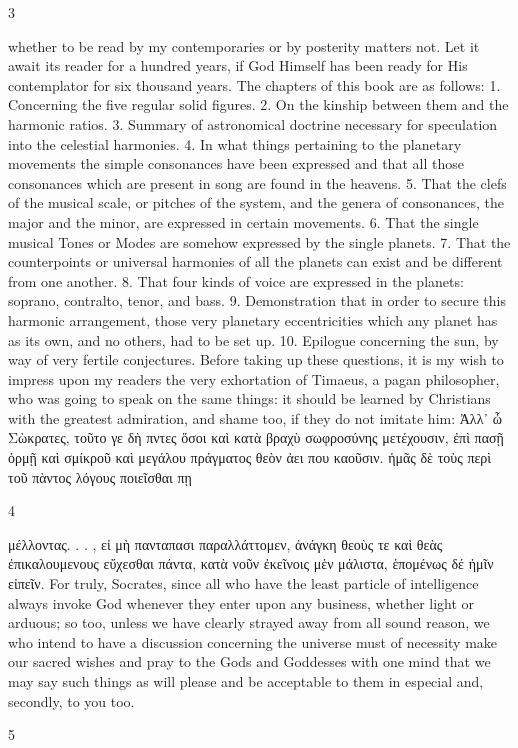 \documentclass{article}
\begin{document}
3

whether to be read by my contemporaries or by posterity matters not.
Let it await its reader for a hundred years, if God Himself has been ready
for His contemplator for six thousand years.
The chapters of this book are as follows:
1. Concerning the five regular solid figures.
2. On the kinship between them and the harmonic ratios.
3. Summary of astronomical doctrine necessary for speculation into the
celestial harmonies.
4. In what things pertaining to the planetary movements the simple
consonances have been expressed and that all those consonances which
are present in song are found in the heavens.
5. That the clefs of the musical scale, or pitches of the system, and the
genera of consonances, the major and the minor, are expressed in certain
movements.
6. That the single musical Tones or Modes are somehow expressed by the
single planets.
7. That the counterpoints or universal harmonies of all the planets can
exist and be different from one another.
8. That four kinds of voice are expressed in the planets: soprano,
contralto, tenor, and bass.
9. Demonstration that in order to secure this harmonic arrangement,
those very planetary eccentricities which any planet has as its own, and
no others, had to be set up.
10. Epilogue concerning the sun, by way of very fertile conjectures.
Before taking up these questions, it is my wish to impress upon my
readers the very exhortation of Timaeus, a pagan philosopher, who was
going to speak on the same things: it should be learned by Christians
with the greatest admiration, and shame too, if they do not imitate him:
Ἀλλ᾽ ὦ Σὼκρατες, τοῦτο γε δὴ πντες ὅσοι καὶ κατὰ βραχὺ σωφροσύνης
μετέχουσιν, ἐπὶ πασῇ ὁρμῇ καὶ σμίκροῦ καὶ μεγάλου πράγματος θεὸν ἀει
που καοῦσιν. ἡμᾶς δὲ τοὺς περὶ τοῦ πὰντος λόγους ποιεῖσθαι πῃ


4

μέλλοντας. . . , εἰ μὴ πανταπασι παραλλάττομεν, ἀνάγκη θεοὺς τε καὶ
θεὰς ἐπικαλουμενους εὔχεσθαι πάντα, κατὰ νοῦν ἐκεῖνοις μἑν μάλιστα,
ἑπομένως δέ ἠμῖν εἰπεῖν. For truly, Socrates, since all who have the least
particle of intelligence always invoke God whenever they enter upon
any business, whether light or arduous; so too, unless we have clearly
strayed away from all sound reason, we who intend to have a
discussion concerning the universe must of necessity make our sacred
wishes and pray to the Gods and Goddesses with one mind that we may
say such things as will please and be acceptable to them in especial and,
secondly, to you too.


5
\end{document}
